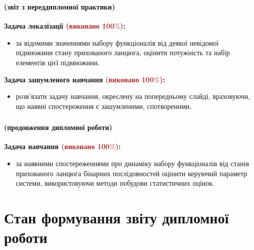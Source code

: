 \documentclass[12pt,mathserif]{beamer}
\theoremstyle{plain}
\begin{document}
\begin{frame}
    \frametitle{\insertsection}
    \framesubtitle{(звіт з переддипломної практики)}
    \textbf{Задача локалізації \textcolor{brown}{(виконано 100$\%$)}:}
    \begin{itemize}
        \item за відомими значеннями набору функціоналів від деякої невідомої підмножини стану прихованого ланцюга, оцінити потужність та набір елементів цієї підмножини.
    \end{itemize}

    \vspace{0.5cm}
    \textbf{Задача зашумленого навчання \textcolor{brown}{(виконано 100$\%$)}:}
    \begin{itemize}
        \item розв'язати задачу навчання, окреслену на попередньому слайді, враховуючи, що наявні спостереження є зашумленими, спотвореними.
    \end{itemize}
\end{frame}

\begin{frame}
    \frametitle{\insertsection}
    \framesubtitle{(продовження дипломної роботи)}
    \textbf{Задача навчання \textcolor{brown}{(виконано 100$\%$)}:}
    \begin{itemize}
        \item за наявними спостереженнями про динаміку набору функціоналів від станів прихованого ланцюга бінарних послідовностей оцінити керуючий параметр системи, використовуючи методи побудови статистичних оцінок.
    \end{itemize}
\end{frame}

\section{Стан формування звіту дипломної роботи}
\end{document}
